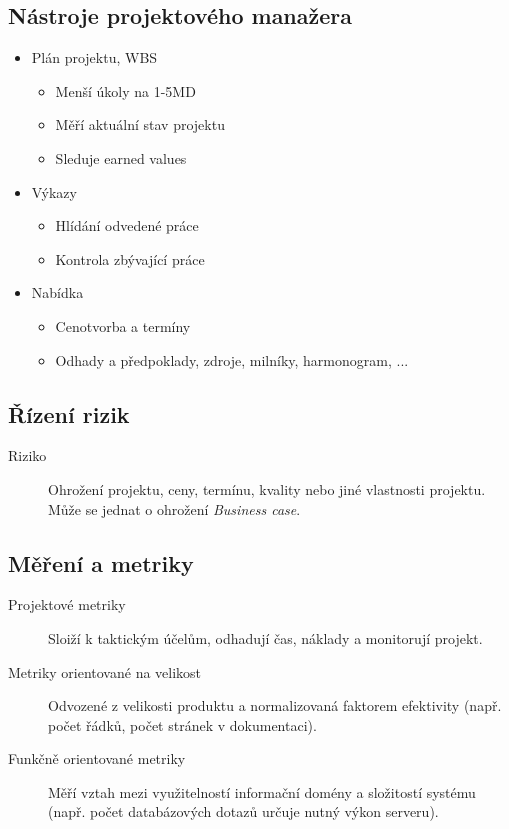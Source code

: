   \subsection{Nástroje projektového manažera}
    \begin{itemize}
      \item Plán projektu, WBS
        \begin{itemize}
          \item Menší úkoly na 1-5MD
          \item Měří aktuální stav projektu
          \item Sleduje earned values
        \end{itemize}
      \item Výkazy
        \begin{itemize}
          \item Hlídání odvedené práce
          \item Kontrola zbývající práce
        \end{itemize}
      \item Nabídka
        \begin{itemize}
          \item Cenotvorba a termíny
          \item Odhady a předpoklady, zdroje, milníky, harmonogram, ...
        \end{itemize}
    \end{itemize}

    \subsection{Řízení rizik}
      \begin{description}
        \item[Riziko] Ohrožení projektu, ceny, termínu, kvality nebo jiné vlastnosti projektu. Může se jednat o ohrožení \emph{Business case}.
      \end{description}

    \subsection{Měření a metriky}
      \begin{description}
        \item[Projektové metriky] Sloiží k taktickým účelům, odhadují čas, náklady a monitorují projekt.
        \item[Metriky orientované na velikost] Odvozené z velikosti produktu a normalizovaná faktorem efektivity (např. počet řádků, počet stránek v dokumentaci).
        \item[Funkčně orientované metriky] Měří vztah mezi využitelností informační domény a složitostí systému (např. počet databázových dotazů určuje nutný výkon serveru).
      \end{description}

